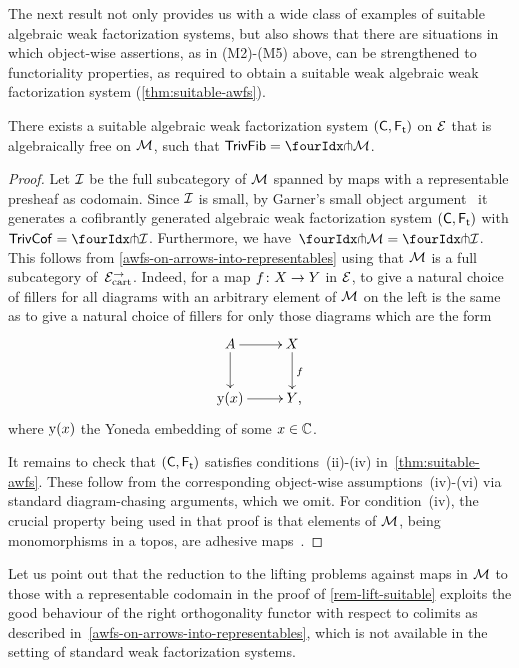 \documentclass[reqno,10pt,a4paper,oneside,draft]{amsart}
\begin{document}
{{The next result not only provides us with a wide class of examples of suitable algebraic weak factorization systems, but also shows that there are situations in which object-wise assertions,
as in (M2)-(M5) above, can be strengthened to functoriality properties, as required to obtain a suitable weak algebraic weak factorization system (\cref{thm:suitable-awfs}). 

\begin{proposition}  \label{rem-lift-suitable} 
There exists a suitable algebraic weak factorization system $(\CC, \TF)$ on $\cal{E}$ that is algebraically free on $\cal{M}$, \ie such that $\TrivFib = \liftr{\cal{M}}$.
\end{proposition}

\begin{proof}
Let $\cal{I}$ be the full subcategory of $\cal{M}$ spanned by maps with a representable presheaf as codomain. 
Since $\cal{I}$ is small, by Garner's small object argument~\cite{garner:small-object-argument} it generates a
cofibrantly generated algebraic weak factorization system $(\CC, \TF)$ with $\TrivCof =  \liftr{\cal{I}}$. Furthermore, we have~$\liftr{\cal{M}} = \liftr{\cal{I}}$.
This follows from \cref{awfs-on-arrows-into-representables} using that $\cal{M}$ is a full subcategory of~$\cal{E}^\to_\cart$. Indeed, for a map $f \co X \to Y$ in $\catE$, to give a natural choice of fillers for all diagrams with an arbitrary element of $\cal{M}$ on the left is the same as to give a natural choice of fillers for only those diagrams which are the form
\[
\xymatrix{
  A
  \ar[r]
  \ar[d]
&
  X
  \ar[d]^f
\\
  \yon(x)
  \ar[r]
&
  Y
\rlap{,}}
\]
where $\yon(x)$ the Yoneda embedding of some $x \in \catC$.

It remains to check that $(\CC, \TF)$ satisfies conditions~(ii)-(iv) in~\cref{thm:suitable-awfs}.
These follow from the corresponding object-wise assumptions~(iv)-(vi) via standard diagram-chasing arguments, which we omit.
For condition~(iv), the crucial property being used in that proof is that elements of $\cal{M}$, being monomorphisms in a topos, are adhesive maps~\cite{garner-lack:adhesive}. 
\end{proof}


Let us point out that the  reduction to the lifting problems against maps in $\cal{M}$ to those with a representable codomain in the proof of \cref{rem-lift-suitable} exploits the good behaviour of the right orthogonality functor with respect to colimits as described in~\cref{awfs-on-arrows-into-representables}, which is not available in the setting of standard weak factorization systems. 



}}
\end{document}
